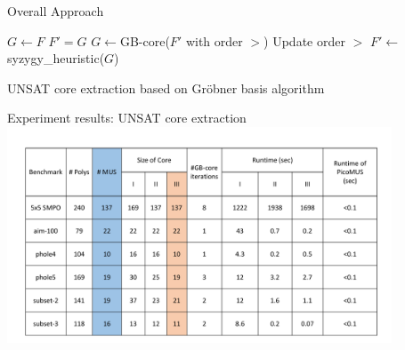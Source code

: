 \documentclass[xcolor=dvipsnames]{beamer}
\begin{document}
\begin{frame}{\large{Overall Approach}}
\begin{algorithm}[H] %
\SetAlgoNoLine
 $G \gets F$\;
  {
	$F' = G$\;
  	$G \gets $GB-core($F'$ with order $>$)\;
	Update order $>$\;
  }
  $F'\gets$syzygy\_heuristic($G$)\;
\caption {UNSAT core extraction based on Gr\"obner basis algorithm}
\end{algorithm}
\end{frame}

\begin{frame}{\large{Experiment results: UNSAT core extraction}}
\\
\includegraphics[width=4.5in]{./table_cp2016.pdf}

\end{frame}
\end{document}
